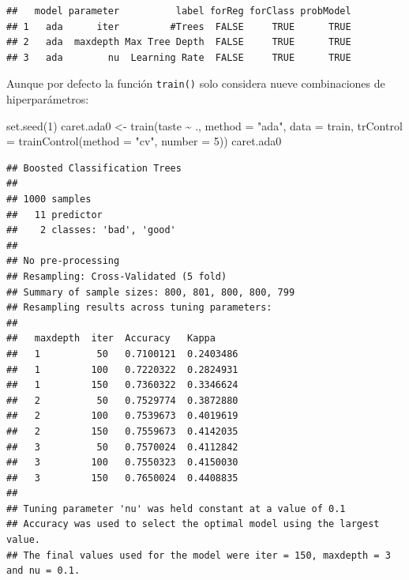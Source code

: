 \documentclass[
  spanish,
]{book}
\newenvironment{Shaded}{\begin{snugshade}}{\end{snugshade}}
\newcommand{\AttributeTok}[1]{\textcolor[rgb]{0.77,0.63,0.00}{#1}}
\newcommand{\DecValTok}[1]{\textcolor[rgb]{0.00,0.00,0.81}{#1}}
\newcommand{\FunctionTok}[1]{\textcolor[rgb]{0.00,0.00,0.00}{#1}}
\newcommand{\NormalTok}[1]{#1}
\newcommand{\OtherTok}[1]{\textcolor[rgb]{0.56,0.35,0.01}{#1}}
\newcommand{\SpecialCharTok}[1]{\textcolor[rgb]{0.00,0.00,0.00}{#1}}
\newcommand{\StringTok}[1]{\textcolor[rgb]{0.31,0.60,0.02}{#1}}
\theoremstyle{break}
\theoremstyle{definition}
\theoremstyle{definition}
\theoremstyle{definition}
\theoremstyle{definition}
\theoremstyle{remark}
\begin{document}
\begin{verbatim}
##   model parameter          label forReg forClass probModel
## 1   ada      iter         #Trees  FALSE     TRUE      TRUE
## 2   ada  maxdepth Max Tree Depth  FALSE     TRUE      TRUE
## 3   ada        nu  Learning Rate  FALSE     TRUE      TRUE
\end{verbatim}

Aunque por defecto la función \texttt{train()} solo considera nueve combinaciones de hiperparámetros:

\begin{Shaded}
\begin{Highlighting}[]
\FunctionTok{set.seed}\NormalTok{(}\DecValTok{1}\NormalTok{)}
\NormalTok{caret.ada0 }\OtherTok{\textless{}{-}} \FunctionTok{train}\NormalTok{(taste }\SpecialCharTok{\textasciitilde{}}\NormalTok{ ., }\AttributeTok{method =} \StringTok{"ada"}\NormalTok{, }\AttributeTok{data =}\NormalTok{ train,}
                   \AttributeTok{trControl =} \FunctionTok{trainControl}\NormalTok{(}\AttributeTok{method =} \StringTok{"cv"}\NormalTok{, }\AttributeTok{number =} \DecValTok{5}\NormalTok{))}
\NormalTok{caret.ada0}
\end{Highlighting}
\end{Shaded}

\begin{verbatim}
## Boosted Classification Trees 
## 
## 1000 samples
##   11 predictor
##    2 classes: 'bad', 'good' 
## 
## No pre-processing
## Resampling: Cross-Validated (5 fold) 
## Summary of sample sizes: 800, 801, 800, 800, 799 
## Resampling results across tuning parameters:
## 
##   maxdepth  iter  Accuracy   Kappa    
##   1          50   0.7100121  0.2403486
##   1         100   0.7220322  0.2824931
##   1         150   0.7360322  0.3346624
##   2          50   0.7529774  0.3872880
##   2         100   0.7539673  0.4019619
##   2         150   0.7559673  0.4142035
##   3          50   0.7570024  0.4112842
##   3         100   0.7550323  0.4150030
##   3         150   0.7650024  0.4408835
## 
## Tuning parameter 'nu' was held constant at a value of 0.1
## Accuracy was used to select the optimal model using the largest value.
## The final values used for the model were iter = 150, maxdepth = 3 and nu = 0.1.
\end{verbatim}

\begin{Shaded}
\end{Shaded}
\end{document}
